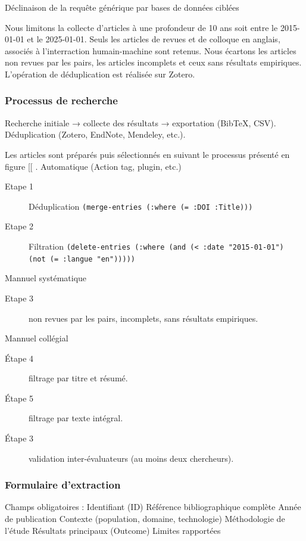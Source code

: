 \documentclass[a4paper,12pt]{article}
\begin{document}
\begin{TABLE}
\begin{center}
\begin{tabular}{ll}
\hline
\end{tabular}
\end{center}
\caption{\label{org34e83da}Déclinaison de la requête générique par bases de données ciblées}
\end{TABLE}

Nous limitons la collecte d'articles à une profondeur de 10 ans soit entre le 2015-01-01 et le 2025-01-01. Seuls les articles de revues et de colloque en anglais, associés à l'interraction humain-machine sont retenus.
Nous écartons les articles non revues par les pairs, les articles incomplets et ceux sans résultats empiriques.
L'opération de déduplication est réalisée sur Zotero.
\subsubsection{Processus de recherche}
\label{sec:orgfaa9b5b}
Recherche initiale → collecte des résultats → exportation (BibTeX, CSV).
Déduplication (Zotero, EndNote, Mendeley, etc.).

Les articles sont préparés puis sélectionnés en suivant le processus présenté en figure [[ .
Automatique (Action tag, plugin, etc.)
\begin{description}
\item[{Etape 1}] Déduplication \texttt{(merge-entries (:where (= :DOI :Title)))}
\item[{Etape 2}] Filtration \texttt{(delete-entries (:where (and (< :date "2015-01-01") (not (= :langue "en")))))}
\end{description}

Mannuel systématique
\begin{description}
\item[{Etape 3}] non revues par les pairs, incomplets, sans résultats empiriques.
\end{description}

Mannuel collégial
\begin{description}
\item[{Étape 4}] filtrage par titre et résumé.
\item[{Étape 5}] filtrage par texte intégral.
\item[{Étape 3}] validation inter-évaluateurs (au moins deux chercheurs).
\end{description}
\subsubsection{Formulaire d’extraction}
\label{sec:org66373b4}
Champs obligatoires :
    Identifiant (ID)
    Référence bibliographique complète
    Année de publication
    Contexte (population, domaine, technologie)
    Méthodologie de l’étude
    Résultats principaux (Outcome)
    Limites rapportées
\end{document}
